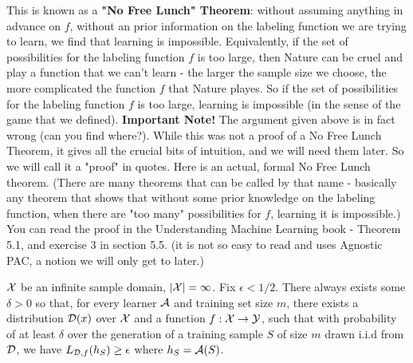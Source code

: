 {\vspace{3mm}
This is known as a {\bf "No Free Lunch" Theorem}: without assuming anything in advance on $f$, without an prior information on the labeling function we are trying to learn, we find that learning is impossible. Equivalently, if the set of possibilities for the labeling function $f$ is too large, then Nature can be cruel and play a function that we can't learn - the larger the sample size we choose, the more complicated the function $f$ that Nature playes. So if the set of possibilities for the labeling function $f$ is too large, learning is impossible (in the sense of the game that we defined).
\vspace{3mm}
{\bf Important Note!} The argument given above is in fact wrong (can you find where?). While this was not a proof of a No Free Lunch Theorem, it gives all the crucial bits of intuition, and we will need them later. So we will call it a "proof" in quotes. 
\vspace{3mm}
Here is an actual, formal No Free Lunch theorem. (There are many theorems that can be called by that name - basically any theorem that shows that without some prior knowledge on the labeling function, when there are "too many" possibilities for $f$, learning it is impossible.) You can read the proof in  the Understanding Machine Learning book - Theorem 5.1, and exercise 3 in section 5.5. (it is not so easy to read and uses Agnostic PAC, a notion we will only get to later.) 


\begin{theorem}
	$\mathcal{X}$ be an infinite sample domain, $|\mathcal{X}|=\infty$. Fix $\epsilon < 1/2$. There always exists some $\delta>0$ so that, for every learner $\mathcal{A}$ and training set size $m$, there exists a distribution $\mathcal{D}(x)$ over $\mathcal{X}$ and a function  $f:\mathcal{X}\to\mathcal{Y}$, such that with probability of at least $\delta$ over the generation of a training sample $S$ of size $m$ drawn i.i.d from $\mathcal{D}$, we have
	$L_{\mathcal{D},f}(h_S) \ge \epsilon$ where $h_S=\mathcal{A}(S)$.
\end{theorem}


}
